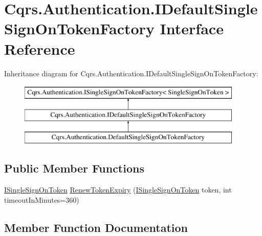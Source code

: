 \hypertarget{interfaceCqrs_1_1Authentication_1_1IDefaultSingleSignOnTokenFactory}{}\section{Cqrs.\+Authentication.\+I\+Default\+Single\+Sign\+On\+Token\+Factory Interface Reference}
\label{interfaceCqrs_1_1Authentication_1_1IDefaultSingleSignOnTokenFactory}
Inheritance diagram for Cqrs.\+Authentication.\+I\+Default\+Single\+Sign\+On\+Token\+Factory\+:\begin{figure}[H]
\begin{center}
\leavevmode
\includegraphics[height=3.000000cm]{interfaceCqrs_1_1Authentication_1_1IDefaultSingleSignOnTokenFactory}
\end{center}
\end{figure}
\subsection*{Public Member Functions}
\begin{DoxyCompactItemize}
\item 
\hyperlink{interfaceCqrs_1_1Authentication_1_1ISingleSignOnToken}{I\+Single\+Sign\+On\+Token} \hyperlink{interfaceCqrs_1_1Authentication_1_1IDefaultSingleSignOnTokenFactory_aff3e7060705a3a8e021c1182ce101b33}{Renew\+Token\+Expiry} (\hyperlink{interfaceCqrs_1_1Authentication_1_1ISingleSignOnToken}{I\+Single\+Sign\+On\+Token} token, int timeout\+In\+Minutes=360)
\end{DoxyCompactItemize}


\subsection{Member Function Documentation}
\mbox{\label{interfaceCqrs_1_1Authentication_1_1IDefaultSingleSignOnTokenFactory_aff3e7060705a3a8e021c1182ce101b33}} 
